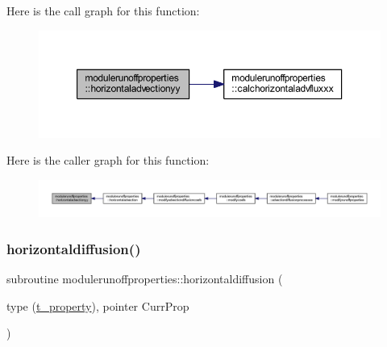 Here is the call graph for this function\+:\nopagebreak
\begin{figure}[H]
\begin{center}
\leavevmode
\includegraphics[width=350pt]{namespacemodulerunoffproperties_a23a3ece2ec9c5af37ce26d5c50ba1c03_cgraph}
\end{center}
\end{figure}
Here is the caller graph for this function\+:\nopagebreak
\begin{figure}[H]
\begin{center}
\leavevmode
\includegraphics[width=350pt]{namespacemodulerunoffproperties_a23a3ece2ec9c5af37ce26d5c50ba1c03_icgraph}
\end{center}
\end{figure}
\mbox{\label{namespacemodulerunoffproperties_af92ead42cead9acb2a8896534d8d3dfb}} 
\subsubsection{\texorpdfstring{horizontaldiffusion()}{horizontaldiffusion()}}
{\footnotesize\ttfamily subroutine modulerunoffproperties\+::horizontaldiffusion (\begin{DoxyParamCaption}\item[{type (\mbox{\hyperlink{structmodulerunoffproperties_1_1t__property}{t\+\_\+property}}), pointer}]{Curr\+Prop }\end{DoxyParamCaption})\hspace{0.3cm}{\ttfamily [private]}}

